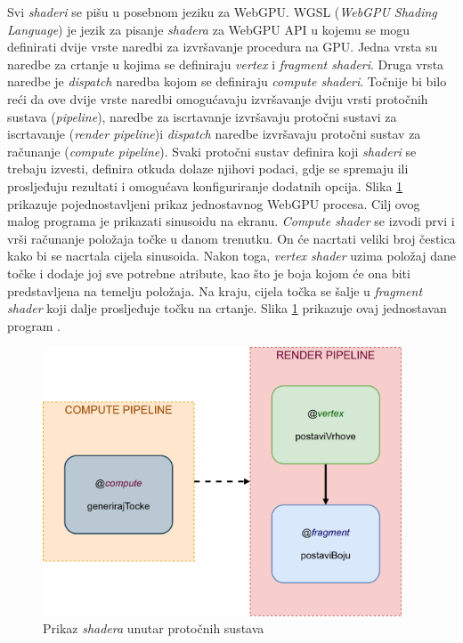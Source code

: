 \documentclass{foi}
\begin{document}
  
Svi \textit{shaderi} se pišu u posebnom jeziku za WebGPU. WGSL (\textit{WebGPU Shading Language}) je jezik za pisanje \textit{shadera} za WebGPU API u kojemu se mogu definirati dvije vrste naredbi za izvršavanje procedura na GPU. Jedna vrsta su naredbe za crtanje u kojima se definiraju \textit{vertex} i \textit{fragment shaderi}. Druga vrsta naredbe je \textit{dispatch} naredba kojom se definiraju \textit{compute shaderi}. Točnije bi bilo reći da ove dvije vrste naredbi omogućavaju izvršavanje dviju vrsti protočnih sustava (\textit{pipeline}), naredbe za iscrtavanje izvršavaju protočni sustavi za iscrtavanje (\textit{render pipeline})i \textit{dispatch} naredbe izvršavaju protočni sustav za računanje (\textit{compute pipeline}). Svaki protočni sustav definira koji \textit{shaderi} se trebaju izvesti, definira otkuda dolaze njihovi podaci, gdje se spremaju ili prosljeđuju rezultati i omogućava konfiguriranje dodatnih opcija. Slika \ref{fig:Pipelines} prikazuje pojednostavljeni prikaz jednostavnog WebGPU procesa. Cilj ovog malog programa je prikazati sinusoidu na ekranu. \textit{Compute shader} se izvodi prvi i vrši računanje položaja točke u danom trenutku. On će nacrtati veliki broj čestica kako bi se nacrtala cijela sinusoida. Nakon toga, \textit{vertex shader} uzima položaj dane točke i dodaje joj sve potrebne atribute, kao što je boja kojom će ona biti predstavljena na temelju položaja. Na kraju, cijela točka se šalje u \textit{fragment shader} koji dalje prosljeđuje točku na crtanje. Slika \ref{fig:Pipelines} prikazuje ovaj jednostavan program \parencite{TourOfWGSL}. 

\begin{figure}[H]
	\centering
	\includegraphics[width=0.95\textwidth]{slike/38_Pipelines.png}
	\captionsetup{justification=centering}
	\caption{Prikaz \textit{shadera} unutar protočnih sustava}
	\label{fig:Pipelines}
\end{figure}
\end{document}
